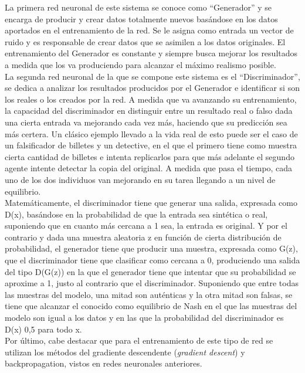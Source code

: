 La primera red neuronal de este sistema se conoce como “Generador” y se encarga de producir y crear datos totalmente nuevos basándose en los datos aportados en el entrenamiento de la red. Se le asigna como entrada un vector de ruido y es responsable de crear datos que se asimilen a los datos originales. El entrenamiento del Generador es constante y siempre busca mejorar los resultados a medida que los va produciendo para alcanzar el máximo realismo posible. \\

La segunda red neuronal de la que se compone este sistema es el “Discriminador”, se dedica a analizar los resultados producidos por el Generador e identificar si son los reales o los creados por la red. A medida que va avanzando su entrenamiento, la capacidad del discriminador en distinguir entre un resultado real o falso dada una cierta entrada va mejorando cada vez más, haciendo que su predicción sea más certera. 
Un clásico ejemplo llevado a la vida real de esto puede ser el caso de un falsificador de billetes y un detective, en el que el primero tiene como muestra cierta cantidad de billetes e intenta replicarlos para que más adelante el segundo agente intente detectar la copia del original. A medida que pasa el tiempo, cada uno de los dos individuos van mejorando en su tarea llegando a un nivel de equilibrio. \\

Matemáticamente, el discriminador tiene que generar una salida, expresada como D(x), basándose en la probabilidad de que la entrada sea sintética o real, suponiendo que en cuanto más cercana a 1 sea, la entrada es original. Y por el contrario y dada una muestra aleatoria z en función de cierta distribución de probabilidad, el generador tiene que producir una muestra, expresada como G(z), que el discriminador tiene que clasificar como cercana a 0, produciendo una salida del tipo D(G(z)) en la que el generador tiene que intentar que su probabilidad se aproxime a 1, justo al contrario que el discriminador. Suponiendo que entre todas las muestras del modelo, una mitad son auténticas y la otra mitad son falsas, se tiene que alcanzar el conocido como equilibrio de Nash en el que las muestras del modelo son igual a los datos y en las que la probabilidad del discriminador es D(x) 0,5 para todo x. \\

Por último, cabe destacar que para el entrenamiento de este tipo de red se utilizan los métodos del gradiente descendente (\textit{gradient descent}) y backpropagation, vistos en redes neuronales anteriores. \\


